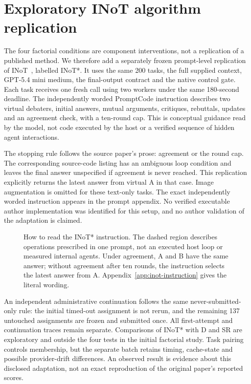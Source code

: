\section{Exploratory INoT algorithm replication}
\label{sec:inot-replication}
The four factorial conditions are component interventions, not a replication of a published method. We therefore add a separately frozen prompt-level replication of INoT~\cite{sun2025inot}, labelled INoT*. It uses the same 200 tasks, the full supplied context, GPT-5.4 mini medium, the final-output contract and the native control gate. Each task receives one fresh call using two workers under the same 180-second deadline. The independently worded PromptCode instruction describes two virtual debaters, initial answers, mutual arguments, critiques, rebuttals, updates and an agreement check, with a ten-round cap. This is conceptual guidance read by the model, not code executed by the host or a verified sequence of hidden agent interactions.

The stopping rule follows the source paper's prose: agreement or the round cap. The corresponding source-code listing has an ambiguous loop condition and leaves the final answer unspecified if agreement is never reached. This replication explicitly returns the latest answer from virtual A in that case. Image augmentation is omitted for these text-only tasks. The exact independently worded instruction appears in the prompt appendix. No verified executable author implementation was identified for this setup, and no author validation of the adaptation is claimed.

\begin{figure}[htbp]\centering

\caption{How to read the INoT* instruction. The dashed region describes operations prescribed in one prompt, not an executed host loop or measured internal agents. Under agreement, A and B have the same answer; without agreement after ten rounds, the instruction selects the latest answer from A. Appendix~\ref{app:inot-instruction} gives the literal wording.}
\label{fig:inot-instruction}
\end{figure}
\FloatBarrier

An independent administrative continuation follows the same never-submitted-only rule: the initial timed-out assignment is not rerun, and the remaining 137 untouched assignments are frozen and submitted once. All first-attempt and continuation traces remain separate. Comparisons of INoT* with D and SR are exploratory and outside the four tests in the initial factorial study. Task pairing controls membership, but the separate batch retains timing, cache-state and possible provider-drift differences. An observed result is evidence about this disclosed adaptation, not an exact reproduction of the original paper's reported scores.
